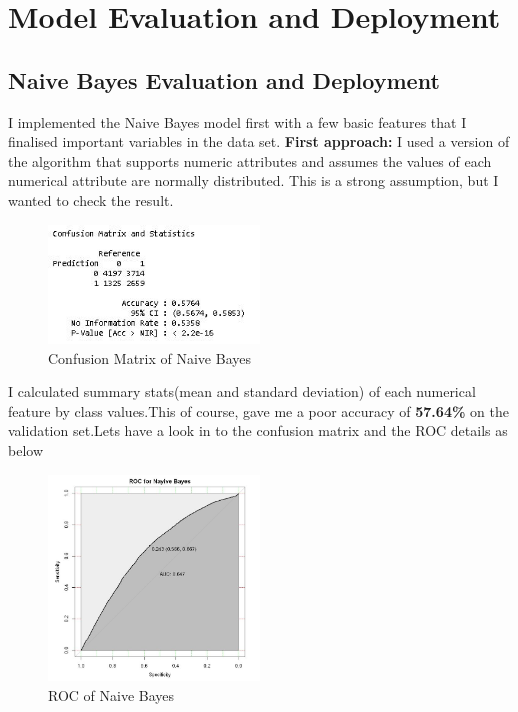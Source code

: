 \documentclass[sigchi]{acmart}
\begin{document}
\section{Model Evaluation and Deployment}
\subsection{Naive Bayes Evaluation and Deployment}
I implemented the Naive Bayes model first with a few basic features that I finalised important variables in the data set.
\textbf{First approach:} I used a version of the algorithm that supports numeric attributes and assumes the values of each numerical attribute are normally distributed. This is a strong assumption, but I wanted to check the result.
\begin{figure}[h!]
    \caption{Confusion Matrix of Naive Bayes}
    \centering
    \includegraphics[width=0.50\textwidth]{ConfusionMatrixand Accuracy of NB.JPG}
\end{figure}

I calculated summary stats(mean and standard deviation) of each numerical feature by class values.This of course, gave me a poor accuracy of \textbf{57.64\%} on the validation set.Lets have a look in to the confusion matrix and the ROC details as below
\begin{figure}[h!]
    \caption{ROC of Naive Bayes}
    \centering
    \includegraphics[width=0.50\textwidth]{ROCofNB.JPG}
\end{figure}
\end{document}
